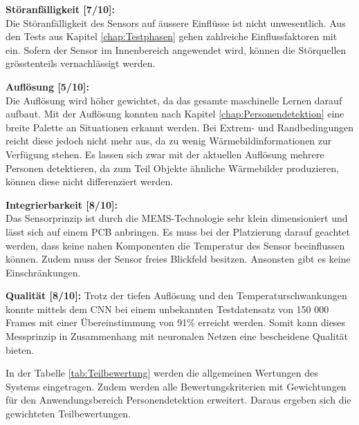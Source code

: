 \textbf{Störanfälligkeit [7/10]:} \\
Die Störanfälligkeit des Sensors auf äussere Einflüsse ist nicht unwesentlich. Aus den Tests aus Kapitel \ref{chap:Testphasen} gehen zahlreiche Einflussfaktoren mit ein. Sofern der Sensor im Innenbereich angewendet wird, können die Störquellen grösstenteils vernachlässigt werden.

\textbf{Auflösung [5/10]:} \\
Die Auflösung wird höher gewichtet, da das gesamte maschinelle Lernen darauf aufbaut. Mit der Auflösung konnten nach Kapitel \ref{chap:Personendetektion} eine breite Palette an Situationen erkannt werden. Bei Extrem- und Randbedingungen reicht diese jedoch nicht mehr aus, da zu wenig Wärmebildinformationen zur Verfügung stehen. Es lassen sich zwar mit der aktuellen Auflösung mehrere Personen detektieren, da zum Teil Objekte ähnliche Wärmebilder produzieren, können diese nicht differenziert werden.  

\textbf{Integrierbarkeit [8/10]:} \\
Das Sensorprinzip ist durch die MEMS-Technologie sehr klein dimensioniert und lässt sich auf einem \ac{PCB} anbringen. Es muss bei der Platzierung darauf geachtet werden, dass keine nahen Komponenten die Temperatur des Sensor beeinflussen können. Zudem muss der Sensor freies Blickfeld besitzen. Ansonsten gibt es keine Einschränkungen. 

\textbf{Qualität [8/10]:}
Trotz der tiefen Auflösung und den Temperaturschwankungen konnte mittels dem \ac{CNN} bei einem unbekannten Testdatensatz von 150 000 Frames mit einer Übereinstimmung von 91\% erreicht werden. Somit kann dieses Messprinzip in Zusammenhang mit neuronalen Netzen eine bescheidene Qualität bieten.

In der Tabelle \ref{tab:Teilbewertung} werden die allgemeinen Wertungen des Systems eingetragen. Zudem werden alle Bewertungskriterien mit Gewichtungen für den Anwendungsbereich Personendetektion erweitert. Daraus ergeben sich die gewichteten Teilbewertungen.

